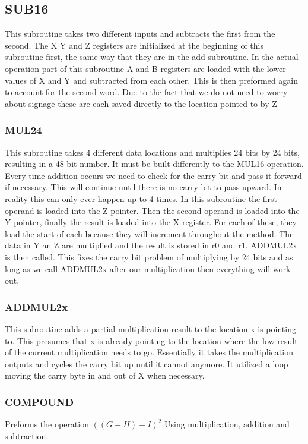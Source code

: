 \documentclass[12pt,letterpaper]{article}
\begin{document}
	\subsection{SUB16}
  	This subroutine takes two different inputs and subtracts the first from the second. The X Y and Z registers are initialized at the beginning of this subroutine first, the same way that they are in the add subroutine. In the actual operation part of this subroutine A and B registers are loaded with the lower values of X and Y and subtracted from each other. This is then preformed again to account for the second word. Due to the fact that we do not need to worry about signage these are each saved directly to the location pointed to by Z 

	\subsubsection{MUL24}
	This subroutine takes 4 different data locations and multiplies 24 bits by 24 bits, resulting in a 48 bit number. It must be built differently to the MUL16 operation. Every time addition occurs  we need to check for the carry bit and pass it forward if necessary. This will continue until there is no carry bit to pass upward. In reality this can only ever happen up to 4 times. In this subroutine the first operand is loaded into the Z pointer. Then the second operand is loaded into the Y pointer, finally the result is loaded into the X register. For each of these, they load the start of each because they will increment throughout the method. The data in Y an Z are multiplied and the result is stored in r0 and r1. ADDMUL2x is then called. This fixes the carry bit problem of multiplying by 24 bits and as long as we call ADDMUL2x after our multiplication then everything will work out. 
	 
	
	\subsubsection{ADDMUL2x}
	This subroutine adds a partial multiplication result to the location x is pointing to. This presumes that x is already pointing to the location where the low result of the current multiplication needs to go. Essentially it takes the multiplication outputs and cycles the carry bit up until it cannot anymore. It utilized a loop moving the carry byte in and out of X when necessary.
	
	\subsubsection{COMPOUND}
	Preforms the operation \(((G-H)+I)^2\) Using multiplication, addition and subtraction.
	
\end{document}
